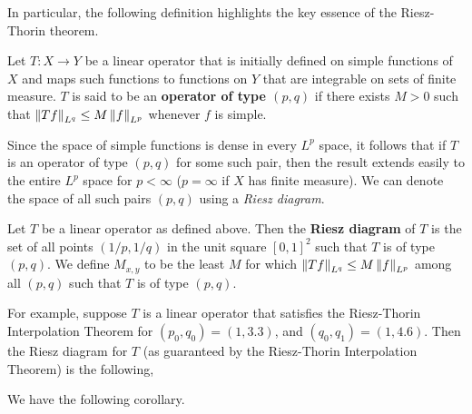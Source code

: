 \documentclass{article}
\begin{document}
In particular, the following definition highlights the key essence of the Riesz-Thorin theorem. 

\begin{definition}
	Let $T: X \to Y$ be a linear operator that is initially defined on simple functions of $X$ and maps such functions to functions on $Y$ that are integrable on sets of finite measure. $T$ is said to be an \textbf{operator of type $(p, q)$} if there exists $M > 0$ such that $\left\Vert Tf \right\Vert_{L^{q}} \leq M\left\Vert f \right\Vert_{L^{p}}$ whenever $f$ is simple. 
\end{definition} 
Since the space of simple functions is dense in every $L^{p}$ space, it follows that if $T$ is an operator of type $(p, q)$ for some such pair, then the result extends easily to the entire $L^{p}$ space for $p < \infty$ ($p = \infty$ if $X$ has finite measure). We can denote the space of all such pairs $(p, q)$ using a \textit{Riesz diagram}.

\begin{definition}
	Let $T$ be a linear operator as defined above. Then the \textbf{Riesz diagram} of $T$ is the set of all points $(1/p, 1/q)$ in the unit square $[0,1]^{2}$ such that $T$ is of type $(p, q)$. We define $M_{x,y}$ to be the least $M$ for which $\left\Vert Tf \right\Vert_{L^{q}} \leq M \left\Vert f \right\Vert_{L^{p}}$ among all $(p, q)$ such that $T$ is of type $(p, q)$. 
\end{definition} 

For example, suppose $T$ is a linear operator that satisfies the Riesz-Thorin Interpolation Theorem for $(p_{0}, q_{0}) = (1,3.3)$, and $(q_{0}, q_{1}) = (1,4.6)$. Then the Riesz diagram for $T$ (as guaranteed by the Riesz-Thorin Interpolation Theorem) is the following, 
\begin{figure}[h!]
	\centering 
\end{figure}

We have the following corollary. 
\end{document}
